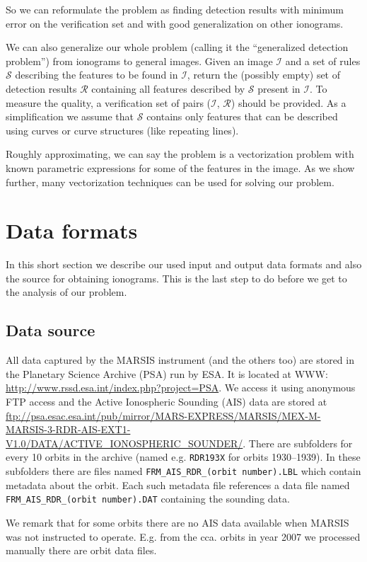 So we can reformulate the problem as finding detection results with minimum error on the verification set and with good generalization on other ionograms.

We can also generalize our whole problem (calling it the ``generalized detection problem'') from ionograms to general images. Given an image $\mathcal{I}$ and a set of rules $\mathcal{S}$ describing the features to be found in $\mathcal{I}$, return the (possibly empty) set of detection results $\mathcal{R}$ containing all features described by $\mathcal{S}$ present in $\mathcal{I}$. To measure the quality, a verification set of pairs ($\mathcal{I}$, $\mathcal{R}$) should be provided. As a simplification we assume that $\mathcal{S}$ contains only features that can be described using curves or curve structures (like repeating lines).

Roughly approximating, we can say the problem is a vectorization problem with known parametric expressions for some of the features in the image. As we show further, many vectorization techniques can be used for solving our problem.

\section{Data formats}
In this short section we describe our used input and output data formats and also the source for obtaining ionograms. This is the last step to do before we get to the analysis of our problem. 

\subsection{Data source}
All data captured by the MARSIS instrument (and the others too) are stored in the Planetary Science Archive (PSA) run by ESA. It is located at WWW: \url{http://www.rssd.esa.int/index.php?project=PSA}. We access it using anonymous FTP access and the Active Ionospheric Sounding (AIS) data are stored at \url{ftp://psa.esac.esa.int/pub/mirror/MARS-EXPRESS/MARSIS/MEX-M-MARSIS-3-RDR-AIS-EXT1-V1.0/DATA/ACTIVE\_IONOSPHERIC\_SOUNDER/}. There are subfolders for every 10 orbits in the archive (named e.g. \texttt{RDR193X} for orbits 1930--1939). In these subfolders there are files named \texttt{FRM\_AIS\_RDR\_(orbit number).LBL} which contain metadata about the orbit. Each such metadata file references a data file named \texttt{FRM\_AIS\_RDR\_(orbit number).DAT} containing the sounding data.

We remark that for some orbits there are no AIS data available when MARSIS was not instructed to operate. E.g. from the cca.  orbits in year 2007 we processed manually there are  orbit data files.

